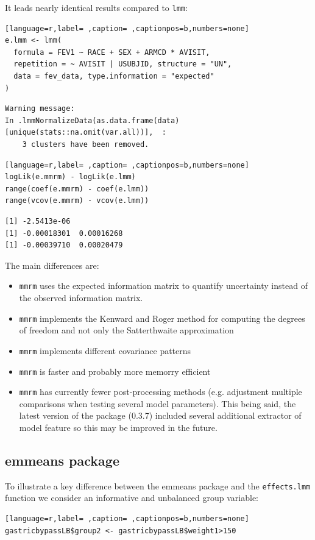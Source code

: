 \documentclass[12pt]{article}
\begin{document}
It leads nearly identical results compared to \texttt{lmm}:
\begin{lstlisting}[language=r,label= ,caption= ,captionpos=b,numbers=none]
e.lmm <- lmm(
  formula = FEV1 ~ RACE + SEX + ARMCD * AVISIT,
  repetition = ~ AVISIT | USUBJID, structure = "UN",
  data = fev_data, type.information = "expected"
)
\end{lstlisting}
\begin{verbatim}
Warning message:
In .lmmNormalizeData(as.data.frame(data)[unique(stats::na.omit(var.all))],  :
    3 clusters have been removed.
\end{verbatim}


\begin{lstlisting}[language=r,label= ,caption= ,captionpos=b,numbers=none]
logLik(e.mmrm) - logLik(e.lmm)
range(coef(e.mmrm) - coef(e.lmm))
range(vcov(e.mmrm) - vcov(e.lmm))
\end{lstlisting}

\begin{verbatim}
[1] -2.5413e-06
[1] -0.00018301  0.00016268
[1] -0.00039710  0.00020479
\end{verbatim}


The main differences are:
\begin{itemize}
\item \texttt{mmrm} uses the expected information matrix to quantify uncertainty
instead of the observed information matrix.
\item \texttt{mmrm} implements the Kenward and Roger method for computing the degrees of
freedom and not only the Satterthwaite approximation
\item \texttt{mmrm} implements different covariance patterns
\item \texttt{mmrm} is faster and probably more memorry efficient
\item \texttt{mmrm} has currently fewer post-processing methods (e.g. adjustment
multiple comparisons when testing several model parameters). This
being said, the latest version of the package (0.3.7) included
several additional extractor of model feature so this may be
improved in the future.
\end{itemize}

\subsection{emmeans package}
\label{sec:orgcc424c3}

To illustrate a key difference between the emmeans package and the
\texttt{effects.lmm} function we consider an informative and unbalanced group
variable:
\begin{lstlisting}[language=r,label= ,caption= ,captionpos=b,numbers=none]
gastricbypassLB$group2 <- gastricbypassLB$weight1>150
\end{lstlisting}
\end{document}
